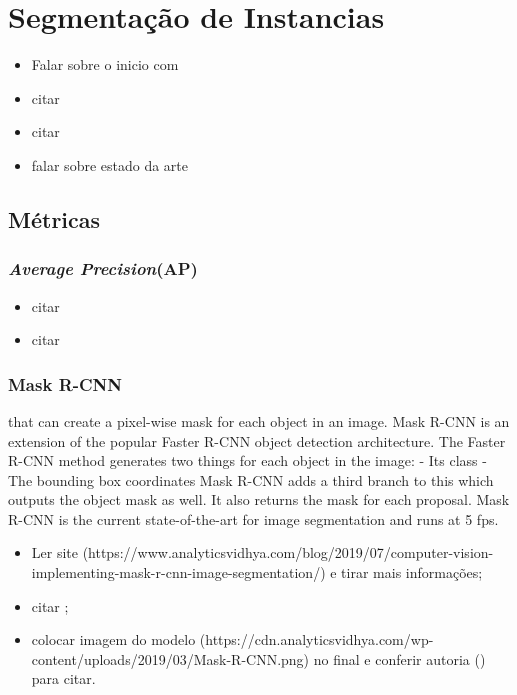 \newpage
\section{Segmentação de Instancias}
\label{instance:instance}
\begin{itemize}
    \item Falar sobre o inicio com \cite{Vaillant1994}
    \item citar \cite{Minaee2021}
    \item citar \cite{Bolya2019}
    \item falar sobre estado da arte \cite{Hafiz2020}
\end{itemize}

\subsection{Métricas}
\subsubsection{\textit{Average Precision}(AP)}
\label{instance:AP}
\begin{itemize}
    \item citar \cite{Hariharan2014}
    \item citar \cite{Lin2014}
\end{itemize}

\subsubsection{Mask R-CNN}
that can create a pixel-wise mask for each object in an image.
Mask R-CNN is an extension of the popular Faster R-CNN object detection architecture.
The Faster R-CNN method generates two things for each object in the image:
 - Its class
 - The bounding box coordinates
Mask R-CNN adds a third branch to this which outputs the object mask as well.
It also returns the mask for each proposal.
Mask R-CNN is the current state-of-the-art for image segmentation and runs at 5 fps.

\begin{itemize}
    \item Ler site (https://www.analyticsvidhya.com/blog/2019/07/computer-vision-implementing-mask-r-cnn-image-segmentation/) e tirar mais informações;
    \item citar \cite{He2020};
    \item colocar imagem do modelo (https://cdn.analyticsvidhya.com/wp-content/uploads/2019/03/Mask-R-CNN.png) no final e conferir autoria (\cite{He2020}) para citar.
\end{itemize}

